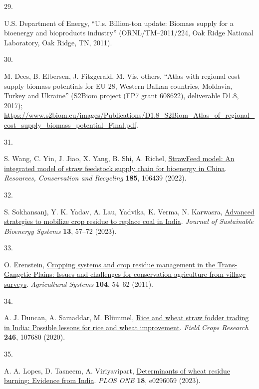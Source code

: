 \documentclass[
  letterpaper,
]{article}
\newlength{\cslhangindent}
\newlength{\csllabelwidth}
\newenvironment{CSLReferences}[2] %
 {\begin{list}{}{%
  \setlength{\itemindent}{0pt}
  \setlength{\leftmargin}{0pt}
  \setlength{\parsep}{0pt}
  \ifodd #1
   \setlength{\leftmargin}{\cslhangindent}
   \setlength{\itemindent}{-1\cslhangindent}
  \fi
  \setlength{\itemsep}{#2\baselineskip}}}
 {\end{list}}
\newcommand{\CSLLeftMargin}[1]{\parbox[t]{\csllabelwidth}{\strut#1\strut}}
\newcommand{\CSLRightInline}[1]{\parbox[t]{\linewidth - \csllabelwidth}{\strut#1\strut}}
\begin{document}
\begin{CSLReferences}{0}{1}
\CSLLeftMargin{29. }%
\CSLRightInline{U.S. Department of Energy, {``U.s. Billion-ton update:
Biomass supply for a bioenergy and bioproducts industry''}
(ORNL/TM--2011/224, Oak Ridge National Laboratory, Oak Ridge, TN,
2011).}

\CSLLeftMargin{30. }%
\CSLRightInline{M. Dees, B. Elbersen, J. Fitzgerald, M. Vis, others,
{``Atlas with regional cost supply biomass potentials for {EU} 28,
{Western Balkan} countries, {Moldavia}, {Turkey} and {Ukraine}''}
(S2Biom project (FP7 grant 608622), deliverable D1.8, 2017);
\url{https://www.s2biom.eu/images/Publications/D1.8_S2Biom_Atlas_of_regional_cost_supply_biomass_potential_Final.pdf}.}

\CSLLeftMargin{31. }%
\CSLRightInline{S. Wang, C. Yin, J. Jiao, X. Yang, B. Shi, A. Richel,
\href{https://doi.org/10.1016/j.resconrec.2022.106439}{{StrawFeed}
model: An integrated model of straw feedstock supply chain for bioenergy
in {China}}. \emph{Resources, Conservation and Recycling} \textbf{185},
106439 (2022).}

\CSLLeftMargin{32. }%
\CSLRightInline{S. Sokhansanj, Y. K. Yadav, A. Lau, Yadvika, K. Verma,
N. Karwasra, \href{https://doi.org/10.4236/jsbs.2023.132004}{Advanced
strategies to mobilize crop residue to replace coal in {India}}.
\emph{Journal of Sustainable Bioenergy Systems} \textbf{13}, 57--72
(2023).}

\CSLLeftMargin{33. }%
\CSLRightInline{O. Erenstein,
\href{https://doi.org/10.1016/j.agsy.2010.09.005}{Cropping systems and
crop residue management in the {Trans-Gangetic Plains}: Issues and
challenges for conservation agriculture from village surveys}.
\emph{Agricultural Systems} \textbf{104}, 54--62 (2011).}

\CSLLeftMargin{34. }%
\CSLRightInline{A. J. Duncan, A. Samaddar, M. Blümmel,
\href{https://doi.org/10.1016/j.fcr.2019.107680}{Rice and wheat straw
fodder trading in {India}: Possible lessons for rice and wheat
improvement}. \emph{Field Crops Research} \textbf{246}, 107680 (2020).}

\CSLLeftMargin{35. }%
\CSLRightInline{A. A. Lopes, D. Tasneem, A. Viriyavipart,
\href{https://doi.org/10.1371/journal.pone.0296059}{Determinants of
wheat residue burning: Evidence from {India}}. \emph{PLOS ONE}
\textbf{18}, e0296059 (2023).}


\end{CSLReferences}
\end{document}
